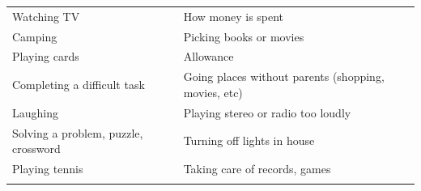 \documentclass[]{book}
\begin{document}
\begin{longtable}[]{@{}ll@{}}
\begin{minipage}[t]{0.50\columnwidth}\raggedright
Watching TV\strut
\end{minipage} & \begin{minipage}[t]{0.44\columnwidth}\raggedright
How money is spent\strut
\end{minipage}\tabularnewline
\begin{minipage}[t]{0.50\columnwidth}\raggedright
Camping\strut
\end{minipage} & \begin{minipage}[t]{0.44\columnwidth}\raggedright
Picking books or movies\strut
\end{minipage}\tabularnewline
\begin{minipage}[t]{0.50\columnwidth}\raggedright
Playing cards\strut
\end{minipage} & \begin{minipage}[t]{0.44\columnwidth}\raggedright
Allowance\strut
\end{minipage}\tabularnewline
\begin{minipage}[t]{0.50\columnwidth}\raggedright
Completing a difficult task\strut
\end{minipage} & \begin{minipage}[t]{0.44\columnwidth}\raggedright
Going places without parents (shopping, movies, etc)\strut
\end{minipage}\tabularnewline
\begin{minipage}[t]{0.50\columnwidth}\raggedright
Laughing\strut
\end{minipage} & \begin{minipage}[t]{0.44\columnwidth}\raggedright
Playing stereo or radio too loudly\strut
\end{minipage}\tabularnewline
\begin{minipage}[t]{0.50\columnwidth}\raggedright
Solving a problem, puzzle, crossword\strut
\end{minipage} & \begin{minipage}[t]{0.44\columnwidth}\raggedright
Turning off lights in house\strut
\end{minipage}\tabularnewline
\begin{minipage}[t]{0.50\columnwidth}\raggedright
Playing tennis\strut
\end{minipage} & \begin{minipage}[t]{0.44\columnwidth}\raggedright
Taking care of records, games\strut
\end{minipage}\tabularnewline
\begin{minipage}[t]{0.50\columnwidth}\raggedright

\end{minipage}
\end{longtable}
\end{document}
